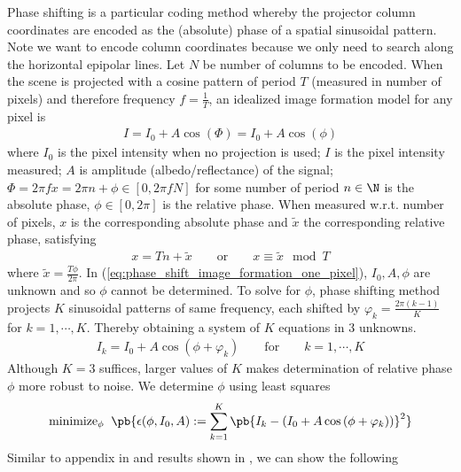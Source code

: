 \documentclass[../writeup.tex]{subfiles}
\begin{document}
Phase shifting is a particular coding method whereby the projector column coordinates are encoded as the (absolute) phase of a spatial sinusoidal pattern. Note we want to encode column coordinates because we only need to search along the horizontal epipolar lines. Let $N$ be number of columns to be encoded. When the scene is projected with a cosine pattern of period $T$ (measured in number of pixels) and therefore frequency $f=\frac{1}{T}$, an idealized image formation model for any pixel is
\begin{align}
    I 
        = I_0 + A\cos\left( \Phi \right)
        = I_0 + A\cos\left( \phi \right)
    \label{eq:phase_shift_image_formation_one_pixel}
\end{align}
where $I_0$ is the pixel intensity when no projection is used; $I$ is the pixel intensity measured; $A$ is amplitude (albedo/reflectance) of the signal; $\Phi = 2\pi f x = 2\pi n + \phi \in [0, 2\pi f N]$ for some number of period $n\in\N$ is the absolute phase, $\phi \in [0,2\pi]$ is the relative phase. When measured w.r.t. number of pixels, $x$ is the corresponding absolute phase and $\tilde{x}$ the corresponding relative phase, satisfying
\begin{align}
    x = Tn + \tilde{x}
    \qquad\text{or}\qquad
    x \equiv \tilde{x} \mod{T}
\end{align}
where $\tilde{x} = \frac{T \phi}{2\pi}$. In (\ref{eq:phase_shift_image_formation_one_pixel}), $I_0,A,\phi$ are unknown and so $\phi$ cannot be determined. To solve for $\phi$, phase shifting method projects $K$ sinusoidal patterns of same frequency, each shifted by $\varphi_k = \frac{2\pi (k-1)}{K}$ for $k=1,\cdots,K$. Thereby obtaining a system of $K$ equations in 3 unknowns. 
\begin{align}
    I_k = I_0 + A\cos\left(\phi + \varphi_k \right)
    \qquad\text{for}\qquad
    k = 1,\cdots,K
    \label{eq:phase_shift_image_formation_one_pixel_shifted}
\end{align}
Although $K=3$ suffices, larger values of $K$ makes determination of relative phase $\phi$ more robust to noise. We determine $\phi$ using least squares
\begin{align}
    \text{minimize}_{\phi}\;\;\pb{
        \epsilon(\phi,I_0,A) := 
            \sum_{k=1}^{K} \pb{
                I_k - \left(
                    I_0 + A\cos\left( \phi + \varphi_k \right)
                \right)
            }^2
    }
    \label{eq:phase_shifting_least_squares}
\end{align}
Similar to appendix in \cite{morenoEmbeddedPhaseShifting2015} and results shown in \cite{pribanicEfficientMultiplePhase2010,morenoEmbeddedPhaseShifting2015}, we can show the following
\end{document}
